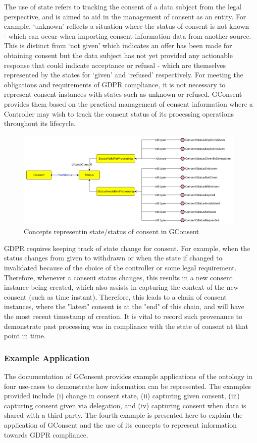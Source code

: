 The use of state refers to tracking the consent of a data subject from the legal perspective, and is aimed to aid in the management of consent as an entity. For example, `unknown' reflects a situation where the status of consent is not known - which can occur when importing consent information data from another source.
This is distinct from `not given' which indicates an offer has been made for obtaining consent but the data subject has not yet provided any actionable response that could indicate acceptance or refusal - which are themselves represented by the states for `given' and `refused' respectively.
For meeting the obligations and requirements of GDPR compliance, it is not necessary to represent consent instances with states such as unknown or refused.
GConsent provides them based on the practical management of consent information where a Controller may wish to track the consent status of its processing operations throughout its lifecycle.
\begin{figure}[htbp]
    \centering
    \includegraphics[width=0.8\linewidth]{img/gconsent_status.png}
    \caption{Concepts representin state/status of consent in GConsent \cite{}}
    \label{fig:vocabs:gconsent-status}
\end{figure}

GDPR requires keeping track of state change for consent. For example, when the status changes from given to withdrawn or when the state if changed to invalidated because of the choice of the controller or some legal requirement. Therefore, whenever a consent status changes, this results in a new consent instance being created, which also assists in capturing the context of the new consent (such as time instant). Therefore, this leads to a chain of consent instances, where the "latest" consent is at the "end" of this chain, and will have the most recent timestamp of creation. It is vital to record such provenance to demonstrate past processing was in compliance with the state of consent at that point in time.

\subsubsection{Example Application}
The documentation of GConsent provides example applications of the ontology in four use-cases to demonstrate  how information can be represented. The examples provided include (i) change in consent state, (ii) capturing given consent, (iii) capturing consent given via delegation, and (iv) capturing consent when data is shared with a third party.
The fourth example is presented here to explain the application of GConsent and the use of its concepts to represent information towards GDPR compliance.

